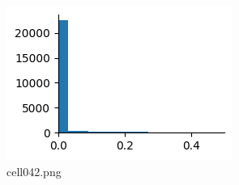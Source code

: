 \begin{figure}[ht]
	\centering
	\includegraphics[scale=0.8, max width=\linewidth]{./fig/energy-based-model/sparse-coding/cell042.png}
	\caption{cell042.png}
	\label{cell042.png}
\end{figure}